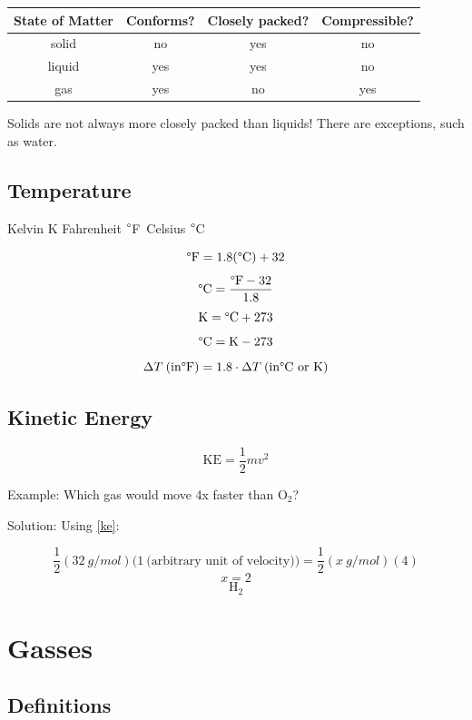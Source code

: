 \documentclass[a4paper, 12pt]{article}
\newcommand{\degC}{$\degree$C \,}
\newcommand{\degF}{$\degree$F \,}
\begin{document}
\begin{table}[H]

\begin{tabular}{c|c|c|c}
\textbf{State of Matter} & \textbf{Conforms?} & \textbf{Closely packed?} & \textbf{Compressible?} \\\hline
solid & no & yes & no \\
liquid & yes & yes & no \\
gas & yes & no & yes
\end{tabular}

\vspace{1em}
Solids are not always more closely packed than liquids! There are exceptions, such as water.

\end{table}

\subsection*{Temperature}
Kelvin K Fahrenheit \degF Celsius \degC

$$\degree \text{F} = 1.8(\degree\text{C}) + 32$$
$$\degree \text{C} = \frac{\degree \text{F} -32}{1.8}$$
$$\text{K} = \degree\text{C} + 273$$
$$\degree\text{C} = \text{K} - 273$$
$$\Delta T \: (\text{in} \degree\text{F}) = 1.8 \cdot \Delta T \: (\text{in} \degree\text{C or K})$$

\subsection*{Kinetic Energy}
\begin{equation}\label{ke}
    \text{KE} = \frac{1}{2}mv^2
\end{equation}

Example: Which gas would move 4x faster than O$_2$?

Solution: Using \ref{ke}:

$$\frac{1}{2}(32 \: g/mol)(1 \: \text{(arbitrary unit of velocity))} = \frac{1}{2}(x \: g/mol)(4)$$
$$x = 2$$
$$\boxed{\text{H}_2}$$

\section{Gasses}

\subsection*{Definitions}
\end{document}
